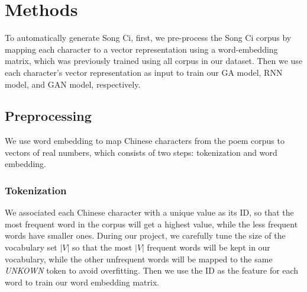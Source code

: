 \section{Methods}
To automatically generate Song Ci, first, we pre-process the Song Ci corpus by mapping each character to a vector representation using a word-embedding matrix, which was previously trained using all corpus in our dataset. 
%
Then we use each character's vector representation as input to train our GA model, RNN model, and GAN model, respectively.
%

\subsection{Preprocessing}
We use word embedding to map Chinese characters from the poem corpus to vectors of real numbers, which consists of two steps: tokenization and word embedding.
% 
%
\subsubsection {Tokenization}
%
We associated each Chinese character with a unique value as its ID, so that the most frequent word in the corpus  will get a highest value, while the less frequent words have smaller ones.
%
During our project, we carefully tune the size of the vocabulary set $|V|$ so that the most $|V|$ frequent words will be kept in our vocabulary, while the other unfrequent words will be mapped to the same \emph{UNKOWN} token to avoid overfitting.
%
Then we use the ID as the feature for each word to train our word embedding matrix.
%
%

